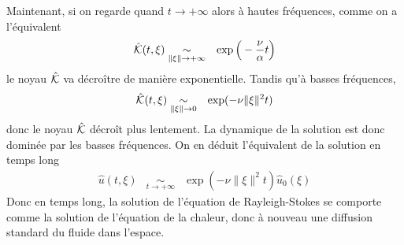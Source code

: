Maintenant, si on regarde quand $t \to +\infty$ alors à hautes fréquences, comme on a l'équivalent
\begin{eqnarray*}
    \hat{\mathcal{K}}(t,\xi) &\underset{\|\xi\|\to+\infty}{\sim}& \exp\Big(-\frac{\nu}{\alpha}t\Big)
\end{eqnarray*}
le noyau $\hat{\mathcal{K}}$ va décroître de manière exponentielle. Tandis qu'à basses fréquences, 
\begin{eqnarray*}
    \hat{\mathcal{K}}(t,\xi) &\underset{\|\xi\|\to 0}{\sim}& \exp(-\nu\|\xi\|^2t)
\end{eqnarray*}
donc le noyau $\hat{\mathcal{K}}$ décroît plus lentement. La dynamique de la solution est donc dominée par les basses fréquences. On en déduit l'équivalent de la solution en temps long
\begin{eqnarray*}
    \hat{u}(t,\xi) &\underset{t \to +\infty}{\sim}& \exp(-\nu\|\xi\|^2t)\hat{u}_0(\xi)
\end{eqnarray*}
Donc en temps long, la solution de l'équation de Rayleigh-Stokes se comporte comme la solution de l'équation de la chaleur, donc à nouveau une diffusion standard du fluide dans l'espace. 


